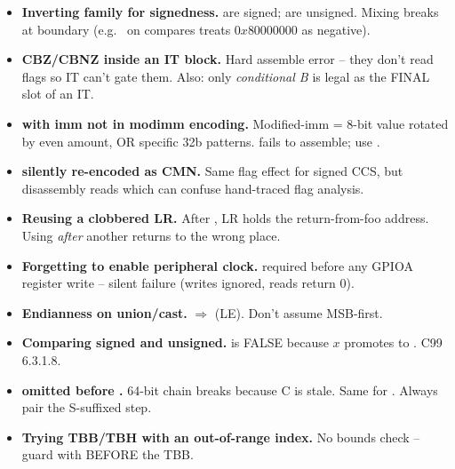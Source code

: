 \begin{itemize}
\item \textbf{Inverting  family for signedness.}  are signed;  are unsigned. Mixing breaks at boundary (e.g.\  on  compares treats $0x80000000$ as negative).
\item \textbf{CBZ/CBNZ inside an IT block.} Hard assemble error -- they don't read flags so IT can't gate them. Also: only \emph{conditional B} is legal as the FINAL slot of an IT.
\item \textbf{ with imm not in modimm encoding.} Modified-imm = 8-bit value rotated by even amount, OR specific 32b patterns.  fails to assemble; use .
\item \textbf{ silently re-encoded as CMN.} Same flag effect for signed CCS, but disassembly reads  which can confuse hand-traced flag analysis.
\item \textbf{Reusing a clobbered LR.} After , LR holds the return-from-foo address. Using  \emph{after} another  returns to the wrong place.
\item \textbf{Forgetting to enable peripheral clock.}  required before any GPIOA register write -- silent failure (writes ignored, reads return 0).
\item \textbf{Endianness on union/cast.}  $\Rightarrow$  (LE). Don't assume MSB-first.
\item \textbf{Comparing signed and unsigned.}  is FALSE because $x$ promotes to . C99 6.3.1.8.
\item \textbf{ omitted before .} 64-bit chain breaks because C is stale. Same for . Always pair the S-suffixed step.
\item \textbf{Trying TBB/TBH with an out-of-range index.} No bounds check -- guard with  BEFORE the TBB.
\end{itemize}

